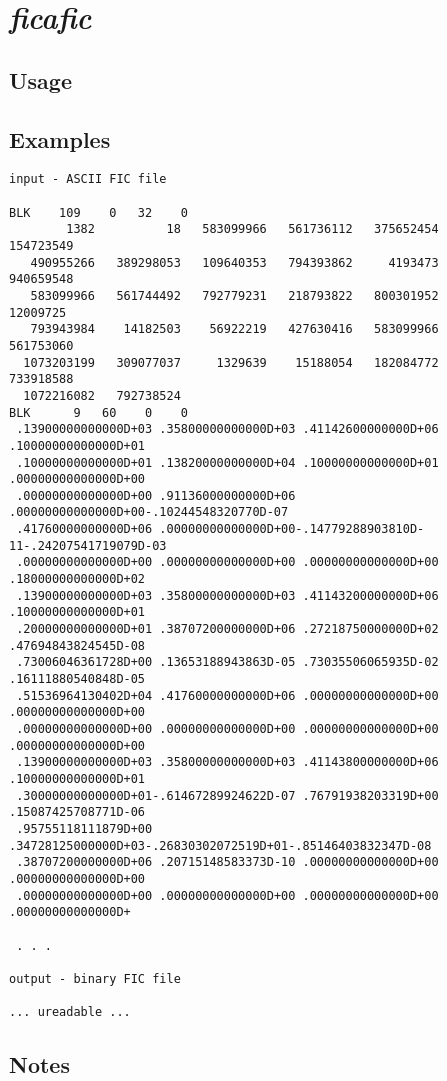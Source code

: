 %
%

\section{\emph{ficafic}}
\subsection{Usage}

\subsection{Examples}
\begin{\outputsize}
\begin{Verbatim}
input - ASCII FIC file

BLK    109    0   32    0
        1382          18   583099966   561736112   375652454   154723549
   490955266   389298053   109640353   794393862     4193473   940659548
   583099966   561744492   792779231   218793822   800301952    12009725
   793943984    14182503    56922219   427630416   583099966   561753060
  1073203199   309077037     1329639    15188054   182084772   733918588
  1072216082   792738524
BLK      9   60    0    0
 .13900000000000D+03 .35800000000000D+03 .41142600000000D+06 .10000000000000D+01
 .10000000000000D+01 .13820000000000D+04 .10000000000000D+01 .00000000000000D+00
 .00000000000000D+00 .91136000000000D+06 .00000000000000D+00-.10244548320770D-07
 .41760000000000D+06 .00000000000000D+00-.14779288903810D-11-.24207541719079D-03
 .00000000000000D+00 .00000000000000D+00 .00000000000000D+00 .18000000000000D+02
 .13900000000000D+03 .35800000000000D+03 .41143200000000D+06 .10000000000000D+01
 .20000000000000D+01 .38707200000000D+06 .27218750000000D+02 .47694843824545D-08
 .73006046361728D+00 .13653188943863D-05 .73035506065935D-02 .16111880540848D-05
 .51536964130402D+04 .41760000000000D+06 .00000000000000D+00 .00000000000000D+00
 .00000000000000D+00 .00000000000000D+00 .00000000000000D+00 .00000000000000D+00
 .13900000000000D+03 .35800000000000D+03 .41143800000000D+06 .10000000000000D+01
 .30000000000000D+01-.61467289924622D-07 .76791938203319D+00 .15087425708771D-06
 .95755118111879D+00 .34728125000000D+03-.26830302072519D+01-.85146403832347D-08
 .38707200000000D+06 .20715148583373D-10 .00000000000000D+00 .00000000000000D+00
 .00000000000000D+00 .00000000000000D+00 .00000000000000D+00 .00000000000000D+

 . . .

output - binary FIC file

... ureadable ...
\end{Verbatim}
\end{\outputsize}

\subsection{Notes}

%

